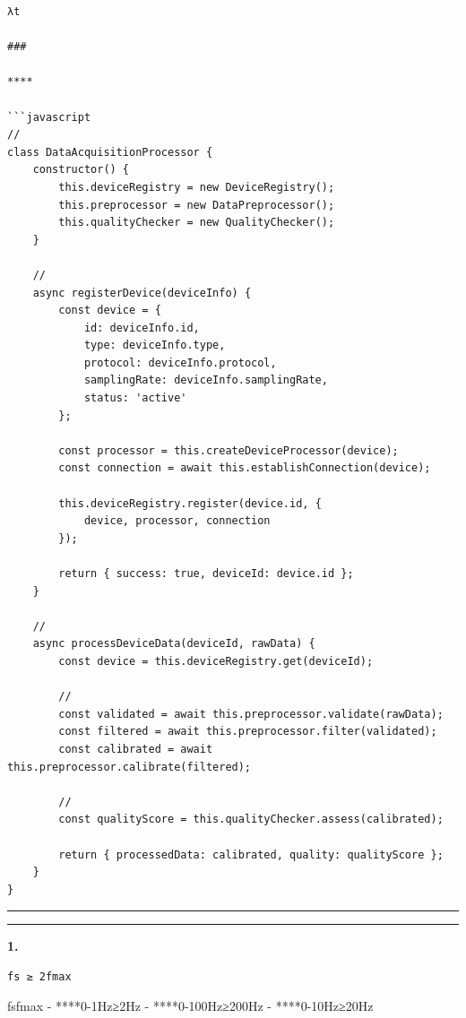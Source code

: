 \begin{verbatim}
λt

### 

****

```javascript
// 
class DataAcquisitionProcessor {
    constructor() {
        this.deviceRegistry = new DeviceRegistry();
        this.preprocessor = new DataPreprocessor();
        this.qualityChecker = new QualityChecker();
    }
    
    // 
    async registerDevice(deviceInfo) {
        const device = {
            id: deviceInfo.id,
            type: deviceInfo.type,
            protocol: deviceInfo.protocol,
            samplingRate: deviceInfo.samplingRate,
            status: 'active'
        };
        
        const processor = this.createDeviceProcessor(device);
        const connection = await this.establishConnection(device);
        
        this.deviceRegistry.register(device.id, {
            device, processor, connection
        });
        
        return { success: true, deviceId: device.id };
    }
    
    // 
    async processDeviceData(deviceId, rawData) {
        const device = this.deviceRegistry.get(deviceId);
        
        // 
        const validated = await this.preprocessor.validate(rawData);
        const filtered = await this.preprocessor.filter(validated);
        const calibrated = await this.preprocessor.calibrate(filtered);
        
        // 
        const qualityScore = this.qualityChecker.assess(calibrated);
        
        return { processedData: calibrated, quality: qualityScore };
    }
}
\end{verbatim}

\begin{center}\rule{0.5\linewidth}{0.5pt}\end{center}

\begin{center}\rule{0.5\linewidth}{0.5pt}\end{center}

\textbf{1. }

\begin{verbatim}
fs ≥ 2fmax
\end{verbatim}

fsfmax - ****0-1Hz≥2Hz - ****0-100Hz≥200Hz - ****0-10Hz≥20Hz

